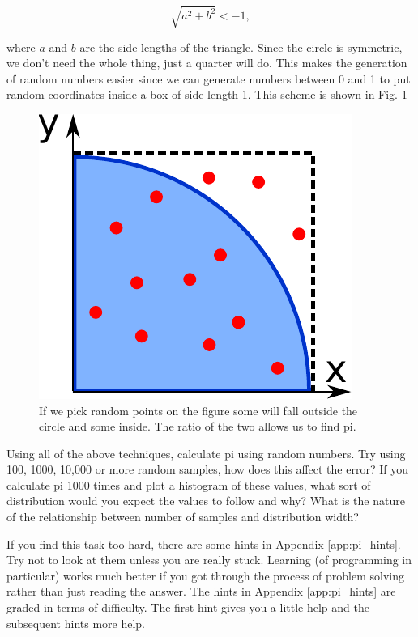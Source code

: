 	\begin{equation}
	\sqrt{a^2+b^2} <- 1,
	\end{equation}

	where $a$ and $b$ are the side lengths of the triangle. Since the circle is symmetric, we don't need the whole thing, just a quarter will do. This makes the generation of random numbers easier since we can generate numbers between 0 and 1 to put random coordinates inside a box of side length 1. This scheme is shown in Fig. \ref{fig:piarc}

	\begin{figure}[h]
		\centering
		\includegraphics[scale=0.6]{images/piarc}
		\caption{If we pick random points on the figure some will fall outside the circle and some inside. The ratio of the two allows us to find pi.}
		\label{fig:piarc}
	\end{figure}

	\begin{task}Using all of the above techniques, calculate pi using random numbers. Try using 100, 1000, 10,000 or more random samples, how does this affect the error? If you calculate pi 1000 times and plot a histogram of these values, what sort of distribution would you expect the values to follow and why? What is the nature of the relationship between number of samples and distribution width?\end{task}
	If you find this task too hard, there are some hints in Appendix \ref{app:pi_hints}. Try not to look at them unless you are really stuck. Learning (of programming in particular) works much better if you got through the process of problem solving rather than just reading the answer. The hints in Appendix \ref{app:pi_hints} are graded in terms of difficulty. The first hint gives you a little help and the subsequent hints more help.

